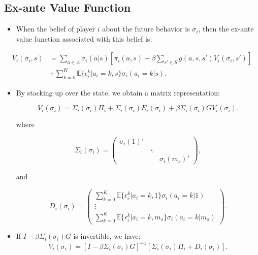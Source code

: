 \documentclass[]{book}
\providecommand{\tightlist}{%
  \setlength{\itemsep}{0pt}\setlength{\parskip}{0pt}}
\begin{document}
\subsection{Ex-ante Value Function}\label{ex-ante-value-function}

\begin{itemize}
\tightlist
\item
  When the belief of player \(i\) about the future behavior is
  \(\sigma_i\), then the ex-ante value function associated with this
  belief is:
\end{itemize}

\begin{equation}
\begin{split}
V_i(\sigma_i, s) &= \sum_{a \in A} \sigma_i(a|s)[\pi_i(a, s) + \beta \sum_{s' \in S} g(a, s, s') V_i(\sigma_i, s')]\\
& + \sum_{k = 0}^K \mathbb{E}\{\epsilon_i^k|a_i = k, s\}\sigma_i(a_i = k|s).
\end{split}
\end{equation}

\begin{itemize}
\tightlist
\item
  By stacking up over the state, we obtain a matrix representation:

  \begin{equation}
  V_i(\sigma_i) = \Sigma_i(\sigma_i) \Pi_i + \Sigma_i(\sigma_i) E_i(\sigma_i) + \beta \Sigma_i(\sigma_i) G V_i(\sigma_i).
  \end{equation}

  where

  \begin{equation}
  \Sigma_i(\sigma_i) = 
  \begin{pmatrix}
  \sigma_i(1)' & & \\
  & \ddots & \\
  & & \sigma_i(m_s)'
  \end{pmatrix},
  \end{equation}

  and

  \begin{equation}
  D_i(\sigma_i) =
  \begin{pmatrix}
  \sum_{k = 0}^K \mathbb{E}\{\epsilon_i^k|a_i = k, 1\}\sigma_i(a_i = k|1)\\
  \vdots\\
  \sum_{k = 0}^K \mathbb{E}\{\epsilon_i^k|a_i = k, m_s\}\sigma_i(a_i = k|m_s)
  \end{pmatrix}.
  \end{equation}
\item
  If \(I - \beta \Sigma_i(\sigma_i)G\) is invertible, we have: \[
  V_i(\sigma_i) = [I - \beta \Sigma_i(\sigma_i)G]^{-1}[\Sigma_i(\sigma_i)\Pi_i + D_i(\sigma_i)].
  \]
\end{itemize}
\end{document}
